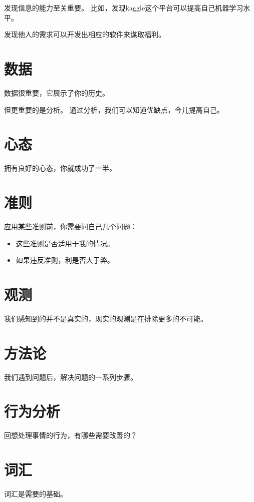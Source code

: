 发现信息的能力至关重要。 比如，发现kaggle这个平台可以提高自己机器学习水平。

发现他人的需求可以开发出相应的软件来谋取福利。


\section{数据}

数据很重要，它展示了你的历史。

但更重要的是分析。 通过分析，我们可以知道优缺点，今儿提高自己。

\section{心态}

拥有良好的心态，你就成功了一半。

\section{准则}

应用某些准则前，你需要问自己几个问题：
\begin{itemize}
\item 这些准则是否适用于我的情况。
\item 如果违反准则，利是否大于弊。
\end{itemize}

\section{观测}

我们感知到的并不是真实的，现实的观测是在排除更多的不可能。

\section{方法论}

我们遇到问题后，解决问题的一系列步骤。

\section{行为分析}

回想处理事情的行为，有哪些需要改善的？

\section{词汇}

词汇是需要的基础。


